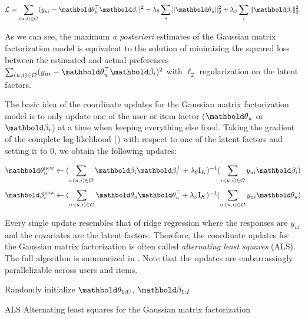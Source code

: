 \begin{equation}
\cL = \sum_{(u, i)\in \cO} (y_{ui} - \mb\theta_u^\top\mb\beta_i)^2 + \lambda_\theta \sum_u \|\mb\theta_u \|^2_2 + \lambda_\beta \sum_i \|\mb\beta_i \|_2^2.
\label{chpt:background:eq:gmf_logll}
\end{equation}

As we can see, the maximum \emph{a posteriori} estimates of the Gaussian matrix factorization model is equivalent to the solution of minimizing the squared loss between the estimated and actual preferences $\sum_{(u, i)\in \mathcal{O}} (y_{ui} - \mb\theta_u^\top\mb\beta_i)^2$ with $\ell_2$ regularization on the latent factors.

The basic idea of the coordinate updates for the Gaussian matrix factorization model is to only update one of the user or item factor ($\mb\theta_u$ or $\mb\beta_i$) at a time when keeping everything else fixed. Taking the gradient of the complete log-likelihood () with respect to one of the latent factors and setting it to $0$, we obtain the following updates:

\begin{equation}
\mb\theta_u^\new \leftarrow (\sum_{i: (u, i) \in \cO} \mb\beta_i \mb\beta_i^\top + \lambda_\theta \mathrm{I}_K)^{-1} (\sum_{i: (u, i) \in \cO} y_{ui} \mb\beta_i)
\label{chpt:background:eq:als_user}
\end{equation}
\begin{equation}
\mb\beta_i^\new \leftarrow (\sum_{u: (u, i)\in\cO} \mb\theta_u \mb\theta_u^\top + \lambda_\beta \mathrm{I}_K)^{-1} (\sum_{u: (u, i)\in\cO} y_{ui} \mb\theta_u)
\label{chpt:background:eq:als_item}
\end{equation}

Every single update resembles that of ridge regression \citep{friedman2001elements} where the responses are $y_{ui}$ and the covariates are the latent factors. Therefore, the coordinate updates for the Gaussian matrix factorization is often called \textit{alternating least squares} (ALS). The full algorithm is summarized in . Note that the updates are embarrassingly parallelizable across users and items. 

\begin{algorithm}
\DontPrintSemicolon %
Randomly initialize $\mb\theta_{1:U}$, $\mb\beta_{1:I}$\;
\;
\caption{{\sc ALS} Alternating least squares for the Gaussian matrix factorization}
\label{chpt:background:algo:gmf}
\end{algorithm}

